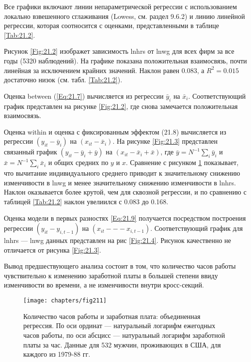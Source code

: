 Все графики включают линии непараметрической регрессии с использованием локально взвешенного сглаживания (Lowess, см. раздел 9.6.2) и линию линейной регрессии, которая соотносится с оценками, представленными в таблице \ref{Tab:21.2}.

Рисунок \ref{Fig:21.2} изображет зависимость lnhrs от lnwg для всех фирм за все годы (5320 наблюдений). На графике показана положительная взаимосвязь, почти линейная за исключением крайних значений. Наклон равен 0.083, а $R^2=0.015$ достаточно низок (см. табл. \ref{Tab:21.2}).

Оценка between (\ref{Eq:21.7}) вычисляется из регрессии $\bar{y}_i$  на $\bar{x}_i$. Соответствующий график представлен на рисунке \ref{Fig:21.2}, где снова замечается положительная взаимосвязь. 

Оценка within и оценка с фиксированным эффектом (21.8) вычисляется из регрессии $(y_{it}-\bar{y}_i)$  на $(x_{it}-\bar{x}_i)$. На рисунке \ref{Fig:21.3} представлен связанный график $(y_{it}-\bar{y}_i+\bar{y})$  на $(x_{it}-\bar{x}_i+\bar{x})$, где $\bar{y}=N^{-1}\sum_{i} \bar{y}_i$ и $\bar{x}=N^{-1} \sum_{i} \bar{x}_i$ и общих средних по $y$ и $x$. Сравнение с рисунком \ref{Fig:21.1} показывает, что вычитание индивидуального среднего приводит к значительному снижению изменчивости в lnwg и менее значительному снижению изменчивости в lnhrs. Наклон оказывается более крутой, чем для сквозной регрессии, и по сравнению с таблицей \ref{Tab:21.2} наклон увелиился с 0.083 до 0.168.

Оценка модели в первых разностях \ref{Eq:21.9} получается посредством построения регрессии $(y_{it}-y_{i,t-1})$ на $(x_{it} --- x_{i,t-1})$. Соответствующий график для lnhrs --- lnwg данных представлен на рис \ref{Fig:21.4}. Рисунок качественно не отличается от рисунка \ref{Fig:21.3}.
 
Вывод предшествующего анализа состоит в том, что количество часов работы чувствительно к изменению заработной платы в большей степени ввиду изменчивости во времени, а не изменчивости внутри кросс-секций.

  \begin{figure}[ht]
                \begin{center}
                    \texttt{[image: chapters/fig211]}
                    \caption{Количество часов работы и заработная плата: объединенная регрессия. По оси ординат --- натуральный логарифм ежегодных часов работы, по оси абсцисс --- натуральный логарифм заработной платы за час. Данные для 532 мужчин, проживающих в США, для каждого из 1979-88 гг. }
                    \label{Fig:21.1}
                \end{center}
     \end{figure}

